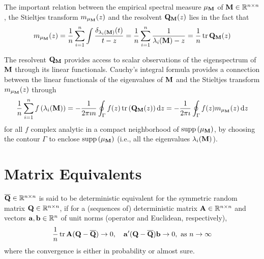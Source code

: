 \begin{remark}
	The important relation between the empirical spectral measure \(\mu_{\mathbf{M}}\) of \(\mathbf{M}\in\mathbb{R}^{n\times n}\), the Stieltjes transform \(m_{\mu_{\mathbf{M}}}(z)\) and the resolvent \(\mathbf{Q}_{\mathbf{M}}(z)\) lies in the fact that
	\begin{equation} \label{eq:relation-between-empirical-spectral-measures-stieltjes-transform-and-its-resolvent}
		m_{\mu_{\mathbf{M}}}(z)=\frac{1}{n}\sum_{i=1}^{n}\int\frac{\delta_{\lambda_{i}(\mathbf{M})}(t)}{t-z}=\frac{1}{n}\sum_{i=1}^{n}\frac{1}{\lambda_{i}(\mathbf{M})-z}=\frac{1}{n}\operatorname{tr}\mathbf{Q}_{\mathbf{M}}(z)
	\end{equation}
\end{remark}

The resolvent \(\mathbf{Q}_{\mathbf{M}}\) provides access to scalar observations of the eigenspectrum of \(\mathbf{M}\) through its linear functionals. Cauchy's integral formula provides a connection between the linear functionals of the eigenvalues of \(\mathbf{M}\) and the Stieltjes transform \(m_{\mu_{\mathbf{M}}}(z)\) through
\begin{equation}
	\frac{1}{n}\sum_{i=1}^{n}f\left(\lambda_{i}(\mathbf{M})\right)=-\frac{1}{2\pi\imath n}\oint_{\Gamma}f(z)\operatorname{tr}\left(\mathbf{Q}_{\mathbf{M}}(z)\right)\mathop{}\!\mathrm{d} z=-\frac{1}{2\pi\imath }\oint_{\Gamma}f(z)m_{\mu_{\mathbf{M}}}(z)\mathop{}\!\mathrm{d} z
\end{equation}
for all \(f\) complex analytic in a compact neighborhood of \(\operatorname{supp}\left(\mu_{\mathbf{M}}\right)\), by choosing the contour \(\Gamma\) to enclose \(\operatorname{supp}\left(\mu_{\mathbf{M}}\right)\) (i.e., all the eigenvalues \(\lambda_{i}(\mathbf{M})\)).

\section{Matrix Equivalents}

\begin{definition}
	\(\overline{\mathbf{Q}}\in\mathbb{R}^{n\times n}\) is said to be deterministic equivalent for the symmetric random matrix \(\mathbf{Q}\in\mathbb{R}^{n\times n}\), if for a (sequences of) deterministic matrix \(\mathbf{A}\in\mathbb{R}^{n\times n}\) and vectors \(\mathbf{a},\mathbf{b}\in\mathbb{R}^{n}\) of unit norms (operator and Euclidean, respectively),
	\begin{equation}
		\frac{1}{n}\operatorname{tr}\bfA(\bfQ-\overline{\bfQ})\rightarrow 0,\quad\bfa^{\prime}(\bfQ-\overline{\bfQ})\bfb\rightarrow 0,\ \text{as}\ n\rightarrow\infty
	\end{equation}
	where the convergence is either in probability or almost sure.
\end{definition}

